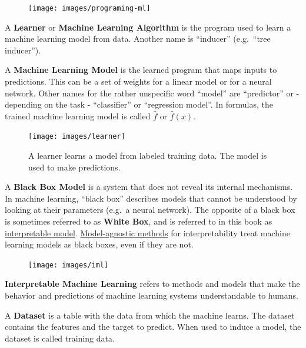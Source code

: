 \documentclass[
  11pt,
]{scrbook}
\begin{document}
\begin{figure}

{\centering \texttt{[image: images/programing-ml]} 

}

\end{figure}

A \textbf{Learner} or \textbf{Machine Learning Algorithm} is the program used to learn a machine learning model from data.
Another name is ``inducer'' (e.g.~``tree inducer'').

A \textbf{Machine Learning Model} is the learned program that maps inputs to predictions.
This can be a set of weights for a linear model or for a neural network.
Other names for the rather unspecific word ``model'' are ``predictor'' or - depending on the task - ``classifier'' or ``regression model''.
In formulas, the trained machine learning model is called \(\hat{f}\) or \(\hat{f}(x)\).

\begin{figure}

{\centering \texttt{[image: images/learner]} 

}

\caption{A learner learns a model from labeled training data. The model is used to make predictions.}\label{fig:learner-definition}
\end{figure}

A \textbf{Black Box Model} is a system that does not reveal its internal mechanisms.
In machine learning, ``black box'' describes models that cannot be understood by looking at their parameters (e.g.~a neural network).
The opposite of a black box is sometimes referred to as \textbf{White Box}, and is referred to in this book as \protect\hyperlink{simple}{interpretable model}.
\protect\hyperlink{agnostic}{Model-agnostic methods} for interpretability treat machine learning models as black boxes, even if they are not.

\begin{figure}

{\centering \texttt{[image: images/iml]} 

}

\end{figure}

\textbf{Interpretable Machine Learning} refers to methods and models that make the behavior and predictions of machine learning systems understandable to humans.

A \textbf{Dataset} is a table with the data from which the machine learns.
The dataset contains the features and the target to predict.
When used to induce a model, the dataset is called training data.
\end{document}
